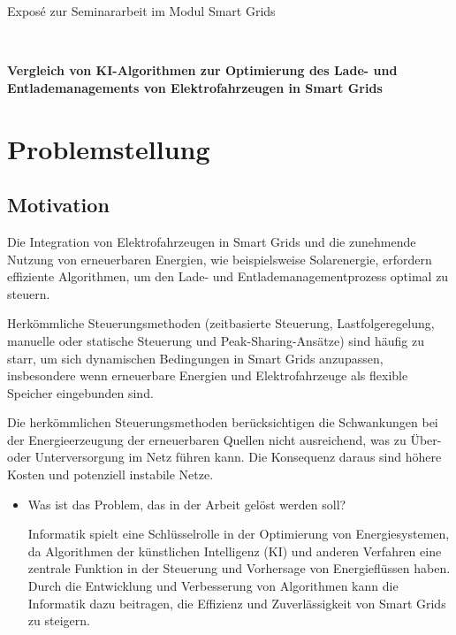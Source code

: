 \documentclass[12pt]{article} %
\begin{document}
\begin{center}
   \baselineskip
   
   Exposé zur Seminararbeit im Modul Smart Grids
   
   ~
   
   {\LARGE\bfseries
     Vergleich von KI-Algorithmen zur Optimierung des Lade- und Entlademanagements
     von Elektrofahrzeugen in Smart Grids}

   \large
   
\end{center}

\section{Problemstellung}

\subsection{Motivation}
Die Integration von Elektrofahrzeugen in Smart Grids und die zunehmende Nutzung von
erneuerbaren Energien, wie beispielsweise Solarenergie, erfordern effiziente Algorithmen,
um den Lade- und Entlademanagementprozess optimal zu steuern.

Herkömmliche Steuerungsmethoden (zeitbasierte Steuerung, Lastfolgeregelung, manuelle
oder statische Steuerung und Peak-Sharing-Ansätze) sind häufig zu starr, um sich
dynamischen Bedingungen in Smart Grids anzupassen, insbesondere wenn erneuerbare
Energien und Elektrofahrzeuge als flexible Speicher eingebunden sind.

Die herkömmlichen Steuerungsmethoden berücksichtigen die Schwankungen bei der Energieerzeugung
der erneuerbaren Quellen nicht ausreichend, was zu Über- oder Unterversorgung im Netz
führen kann. Die Konsequenz daraus sind höhere Kosten und potenziell instabile Netze.



\begin{itemize}
\item Was ist das Problem, das in der Arbeit gelöst werden soll?

Informatik spielt eine Schlüsselrolle in der Optimierung von Energiesystemen, da Algorithmen der künstlichen Intelligenz (KI) und anderen Verfahren eine zentrale Funktion in der Steuerung und Vorhersage von Energieflüssen haben. Durch die Entwicklung und Verbesserung von Algorithmen kann die Informatik dazu beitragen, die Effizienz und Zuverlässigkeit von Smart Grids zu steigern.
\end{itemize}
\end{document}
